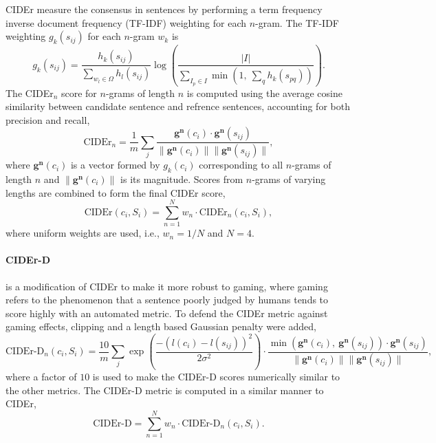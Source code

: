 CIDEr measure the consensus in sentences by performing a term frequency inverse document frequency (TF-IDF) weighting for each $n$-gram.
The TF-IDF weighting $g_k(s_{ij})$ for each $n$-gram $w_k$ is
\begin{equation*}
g_k(s_{ij}) = \frac{h_k(s_{ij})} {\sum_{w_l \in \Omega} h_l(s_{ij})} 
              \log \left( \frac{| I |} {\sum_{I_p \in I} \min\left( 1,~ \sum_q h_k(s_{pq}) \right)} \right).
\end{equation*}
The CIDEr$_n$ score for $n$-grams of length $n$ is computed using the average cosine similarity between candidate sentence and refrence sentences,
accounting for both precision and recall,
\begin{equation*}
\text{CIDEr}_n = 
\frac{1}{m} \sum_j 
\frac{\mathbf{g}^\mathbf{n}(c_i) \cdot \mathbf{g}^\mathbf{n}(s_{ij})} {\|\mathbf{g}^\mathbf{n}(c_i)\| \|\mathbf{g}^\mathbf{n}(s_{ij})\|},
\end{equation*}
where $\mathbf{g}^\mathbf{n}(c_i)$ is a vector formed by $g_k(c_i)$ corresponding to all $n$-grams of length $n$ and 
$\|\mathbf{g}^\mathbf{n}(c_i)\|$ is its magnitude. Scores from $n$-grams of varying lengths are combined to form the final CIDEr score,
\begin{equation*}
\text{CIDEr}(c_i, S_i) = \sum_{n=1}^N w_n \cdot \text{CIDEr}_n(c_i, S_i),
\end{equation*}
where uniform weights are used, i.e., $w_n = 1/N$ and $N=4$.

\paragraph{CIDEr-D} is a modification of CIDEr to make it more robust to gaming, 
where gaming refers to the phenomenon that a sentence poorly judged by humans tends to score highly with an automated metric.
To defend the CIDEr metric against gaming effects,
clipping and a length based Gaussian penalty were added,
\begin{equation}
\label{eq:cider-d}
\text{CIDEr-D}_n (c_i, S_i) = 
\frac{10}{m} \sum_j \exp\left( \frac{-\left( l(c_i) - l(s_{ij}) \right)^2} {2 \sigma^2} \right) \cdot
\frac{\min\left( \mathbf{g}^\mathbf{n}(c_i),~\mathbf{g}^\mathbf{n}(s_{ij}) \right) \cdot \mathbf{g}^\mathbf{n}(s_{ij})}
     {\|\mathbf{g}^\mathbf{n}(c_i)\| \|\mathbf{g}^\mathbf{n}(s_{ij})\|},
\end{equation}
where a factor of $10$ is used to make the CIDEr-D scores numerically similar to the other metrics. 
The CIDEr-D metric is computed in a similar manner to CIDEr,
\begin{equation*}
\text{CIDEr-D} = \sum_{n=1}^N w_n \cdot \text{CIDEr-D}_n(c_i, S_i).
\end{equation*}

